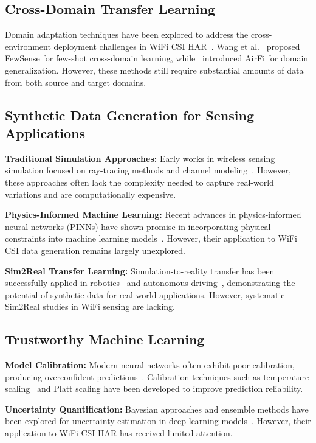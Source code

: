 \documentclass[journal]{IEEEtran}
\begin{document}
\subsection{Cross-Domain Transfer Learning}

Domain adaptation techniques have been explored to address the cross-environment deployment challenges in WiFi CSI HAR~\cite{fewsense2022}. Wang et al.~\cite{fewsense2022} proposed FewSense for few-shot cross-domain learning, while~\cite{airfi2022} introduced AirFi for domain generalization. However, these methods still require substantial amounts of data from both source and target domains.

\subsection{Synthetic Data Generation for Sensing Applications}

\textbf{Traditional Simulation Approaches:} Early works in wireless sensing simulation focused on ray-tracing methods and channel modeling~\cite{ray_tracing_wireless2000}. However, these approaches often lack the complexity needed to capture real-world variations and are computationally expensive.

\textbf{Physics-Informed Machine Learning:} Recent advances in physics-informed neural networks (PINNs) have shown promise in incorporating physical constraints into machine learning models~\cite{pinn_karniadakis2021}. However, their application to WiFi CSI data generation remains largely unexplored.

\textbf{Sim2Real Transfer Learning:} Simulation-to-reality transfer has been successfully applied in robotics~\cite{sim2real_robotics2017} and autonomous driving~\cite{sim2real_autonomous2019}, demonstrating the potential of synthetic data for real-world applications. However, systematic Sim2Real studies in WiFi sensing are lacking.

\subsection{Trustworthy Machine Learning}

\textbf{Model Calibration:} Modern neural networks often exhibit poor calibration, producing overconfident predictions~\cite{calibration_guo2017}. Calibration techniques such as temperature scaling~\cite{temperature_scaling2017} and Platt scaling have been developed to improve prediction reliability.

\textbf{Uncertainty Quantification:} Bayesian approaches and ensemble methods have been explored for uncertainty estimation in deep learning models~\cite{reliability_assessment2019}. However, their application to WiFi CSI HAR has received limited attention.
\end{document}
